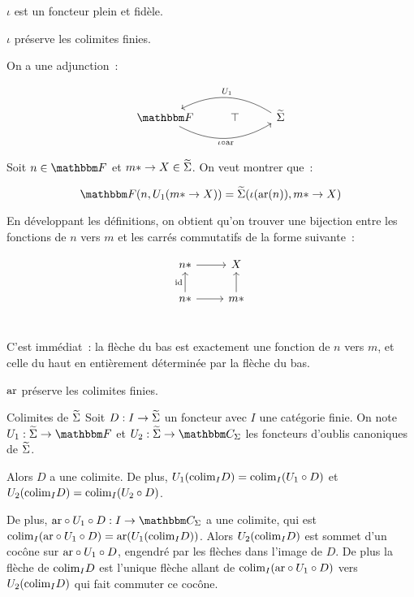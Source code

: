 \begin{lem}
    $\iota$ est un foncteur plein et fidèle.
\end{lem}

\begin{cor}
    $\iota$ préserve les colimites finies.
\end{cor}

\begin{lem}
    On a une adjunction~:

    \[\begin{tikzcd}
        \cf\arrow[rr, bend right, swap, "\iota\circ\arf"] & \top
            & \tsigma\arrow[ll, bend right, swap, "U_1"] \\
    \end{tikzcd}\]
\end{lem}

\begin{pv}
    Soit $n\in\cf$ et $m\ast\rightarrow X\in\widetilde{\Sigma}$. On veut montrer que~:

    \[\cf(n, U_1(m\ast\rightarrow X)) = \tsigma(\iota(\arf(n)), m\ast\rightarrow X)\]

    En développant les définitions, on obtient qu'on trouver une bijection entre
    les fonctions de $n$ vers $m$ et les carrés commutatifs de la forme suivante~:

    \[\begin{tikzcd}
        n\ast\arrow[r] & X \\
        n\ast\arrow[u, "\id"]\arrow[r] & m\ast\arrow[u] \\
    \end{tikzcd}\]

    C'est immédiat~: la flèche du bas est exactement une fonction de $n$ vers $m$,
    et celle du haut en entièrement déterminée par la flèche du bas.
\end{pv}

\begin{cor}\label{arfExact}
    $\text{ar}$ préserve les colimites finies.
\end{cor}

\begin{theo}{Colimites de $\widetilde{\Sigma}$}\label{commaCL}
    Soit $D : I\rightarrow\widetilde{\Sigma}$ un foncteur avec $I$ une catégorie finie. On note
    $U_1 : \tsigma\rightarrow\cf$ et $U_2 : \tsigma\rightarrow\C_\Sigma$ les foncteurs
    d'oublis canoniques de $\widetilde{\Sigma}$.

    Alors $D$ a une colimite. De plus, $U_1(\text{colim}_I D) = \text{colim}_I (U_1\circ D)$ et
    $U_2(\text{colim}_I D) = \text{colim}_I (U_2\circ D)$.

    De plus, $\arf\circ U_1\circ D : I\rightarrow\C_\Sigma$ a une colimite, qui
    est $\text{colim}_I (\text{ar}\circ U_1\circ D) = \text{ar}(U_1(\text{colim}_I D))$. Alors
    $U_2(\text{colim}_I D)$ est sommet d'un cocône sur $\text{ar}\circ U_1\circ D$, engendré
    par les flèches dans l'image de $D$. De plus la flèche de $\text{colim}_I D$ est
    l'unique flèche allant de $\text{colim}_I (\text{ar}\circ U_1\circ D)$ vers $U_2(\text{colim}_I D)$
    qui fait commuter ce cocône.
\end{theo}

